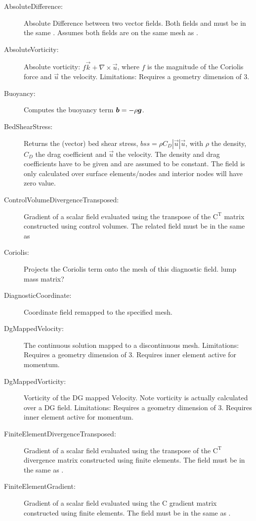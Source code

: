 \begin{description}    
 \item[AbsoluteDifference:]Absolute Difference between two vector fields. Both fields and  must be in the same . Assumes both fields are on the same mesh as .  
 \item[AbsoluteVorticity:]Absolute vorticity:  $f\vec{k} + \nabla \times \vec{u}$, where $f$ is the magnitude of the Coriolis force and $\vec{u}$ the velocity.
	Limitations: Requires a geometry dimension of 3.
 \item[Buoyancy:]Computes the buoyancy term ${\mbox{\boldmath$b$}}=-\rho{\mbox{\boldmath$g$}}$.
 \item[BedShearStress:]Returns the (vector) bed shear stress, $bss = \rho C_D|\vec{u}|\vec{u}$, with $\rho$ the density, $C_D$ the drag coefficient and $\vec{u}$ the velocity. The density and drag coefficients have to be given and are assumed to be constant. The field is only calculated over surface elements/nodes and interior nodes will have zero value.  
 \item[ControlVolumeDivergenceTransposed:]Gradient of a scalar field evaluated using the transpose of the $\mathrm{C}^\mathrm{T}$ matrix constructed using control volumes. The related field must be in the same  as 
 \item[Coriolis:]Projects the Coriolis term onto the mesh of this diagnostic field. lump mass matrix? 
 \item[DiagnosticCoordinate:]Coordinate field remapped to the specified mesh.   
 \item[DgMappedVelocity:]The continuous solution mapped to a discontinuous mesh.
  Limitations: Requires a geometry dimension of 3. Requires inner element active for momentum.
 \item[DgMappedVorticity:]Vorticity of the DG mapped Velocity. Note vorticity is actually calculated over a DG field.
  Limitations: Requires a geometry dimension of 3. Requires inner element active for momentum.
 \item[FiniteElementDivergenceTransposed:]Gradient of a scalar field evaluated using the transpose of the $\mathrm{C}^\mathrm{T}$ divergence matrix constructed using finite elements. The field must be in the same  as .   
 \item[FiniteElementGradient:]Gradient of a scalar field evaluated using the C gradient matrix constructed using finite elements. The field must be in the same  as . 

\end{description}
